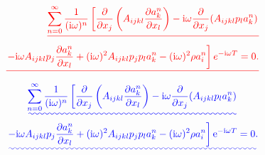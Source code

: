 \documentclass [a4paper,12pt]{paper}
\providecommand{\DIFadd}[1]{{\protect\color{blue}\uwave{#1}}} %
\providecommand{\DIFdel}[1]{{\protect\color{red}\sout{#1}}}                      %
\providecommand{\DIFaddbegin}{} %
\providecommand{\DIFaddend}{} %
\providecommand{\DIFdelbegin}{} %
\providecommand{\DIFdelend}{} %
\begin{document}
\DIFdelbegin \begin{eqnarray*}
\DIFdel{\sum_{n=0}^{\infty}\frac{1}{(\ii\omega)^{n}}\left[\frac{\partial}{\partial x_{j}}\left(A_{ijkl}\frac{\partial a_{k}^{n}}{\partial x_{l}}\right)-\ii\omega\frac{\partial}{\partial x_{j}}(A_{ijkl}p_{l}a_{k}^{n}) \right. }\\
\DIFdel{\left. -\ii\omega A_{ijkl}p_{j}\frac{\partial a_{k}^{n}}{\partial x_{l}}+(\ii\omega)^{2}A_{ijkl}p_{j}p_{l}a_{k}^{n}-(\ii\omega)^{2}\rho a_{i}^{n}\right]e^{-\ii\omega T}=0 .
}\end{eqnarray*}%
\DIFdelend \DIFaddbegin \begin{multline}
\DIFadd{\sum_{n=0}^{\infty}\frac{1}{(\ii\omega)^{n}}\left[\frac{\partial}{\partial x_{j}}\left(A_{ijkl}\frac{\partial a_{k}^{n}}{\partial x_{l}}\right)-\ii\omega\frac{\partial}{\partial x_{j}}(A_{ijkl}p_{l}a_{k}^{n}) \right. }\\
\DIFadd{\left. -\ii\omega A_{ijkl}p_{j}\frac{\partial a_{k}^{n}}{\partial x_{l}}+(\ii\omega)^{2}A_{ijkl}p_{j}p_{l}a_{k}^{n}-(\ii\omega)^{2}\rho a_{i}^{n}\right]\ee^{-\ii\omega T}=0.
\label{eq:17}
}\end{multline}\DIFaddend 
\end{document}
